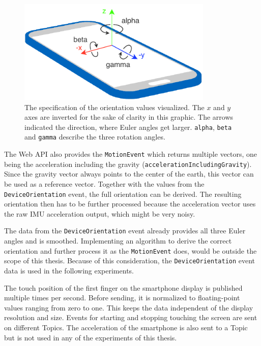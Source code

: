 \begin{figure}[H]
	\centering
	\includegraphics[height=5cm]{figures/implementation/webapi_device_orientation.pdf}
	\caption[Smart device coordinate system and orientation values]{The specification of the orientation values visualized. The \(x\) and \(y\) axes are inverted for the sake of clarity in this graphic. The arrows indicated the direction, where Euler angles get larger. \lstinline{alpha}, \lstinline{beta} and \lstinline{gamma} describe the three rotation angles.}\label{fig:webapi-device-orientation}
\end{figure}

The Web \gls{API} also provides the \lstinline{MotionEvent} which returns multiple vectors, one being the acceleration including the gravity (\lstinline{accelerationIncludingGravity}). Since the gravity vector always points to the center of the earth, this vector can be used as a reference vector. Together with the values from the \lstinline{DeviceOrientation} event, the full orientation can be derived. The resulting orientation then has to be further processed because the acceleration vector uses the raw \gls{IMU} acceleration output, which might be very noisy.

The data from the \lstinline{DeviceOrientation} event already provides all three Euler angles and is smoothed. Implementing an algorithm to derive the correct orientation and further process it as the \lstinline{MotionEvent} does, would be outside the scope of this thesis. Because of this consideration, the \lstinline{DeviceOrientation} event data is used in the following experiments.

The touch position of the first finger on the smartphone display is published multiple times per second. Before sending, it is normalized to floating-point values ranging from zero to one. This keeps the data independent of the display resolution and size. Events for starting and stopping touching the screen are sent on different Topics. The acceleration of the smartphone is also sent to a Topic but is not used in any of the experiments of this thesis.


